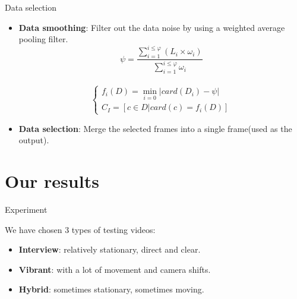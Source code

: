 \documentclass[aspectratio=43,display]{beamer}
\begin{document}
			\begin{frame}{Data selection}
				
				\begin{itemize}
					\item \textbf{Data smoothing}: Filter out the data noise by using a weighted average pooling filter.\\
					$$ \psi = \frac{\sum_{i=1}^{i\leqslant\varphi} (L_i \times \omega_i) }{\sum_{i=1}^{i\leqslant\varphi} \omega_i} $$\\
					$$ 
					    \left\{
							\begin{array}{ll}
								f_i(D) = \min_{i=0} |card(D_i) - \psi| \\
								C_I = [c \in D | card(c) = f_i(D) ]
							\end{array}
						\right. 
					$$
					\item \textbf{Data selection}: Merge the selected frames into a single frame(used as the output).
				\end{itemize}

			\end{frame}


	\section{Our results}

		\begin{frame}{Experiment}

			We have chosen 3 types of testing videos:

			\begin{itemize}
				\item \textbf{Interview}: relatively stationary, direct and clear.
				\item \textbf{Vibrant}: with a lot of movement and camera shifts.
				\item \textbf{Hybrid}: sometimes stationary, sometimes moving.
			\end{itemize}

		\end{frame}
\end{document}
